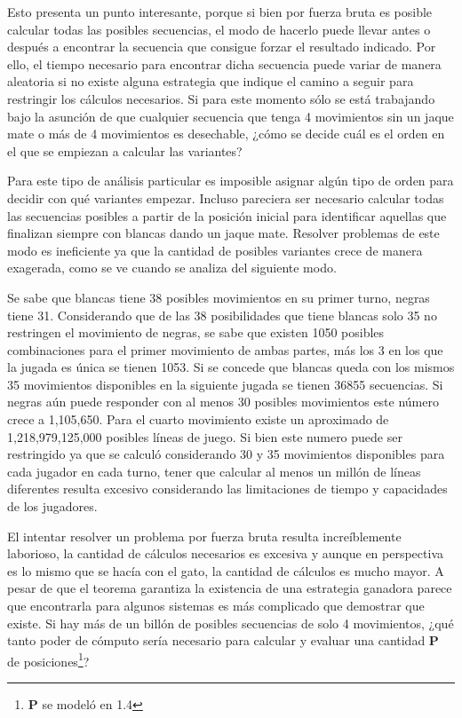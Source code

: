\documentclass[twoside,openright,12pt,a4paper,spanish]{book}
\begin{document}
Esto presenta un punto interesante, porque si bien por fuerza bruta es posible calcular todas las posibles secuencias, el modo de hacerlo puede llevar antes o después a encontrar la secuencia que consigue forzar el resultado indicado. Por ello, el tiempo necesario para encontrar dicha secuencia puede variar de manera aleatoria si no existe alguna estrategia que indique el camino a seguir para restringir los cálculos necesarios. Si para este momento sólo se está trabajando bajo la asunción de que cualquier secuencia que tenga 4 movimientos sin un jaque mate o más de 4 movimientos es desechable, ¿cómo se decide cuál es el orden en el que se empiezan a calcular las variantes?

Para este tipo de análisis particular es imposible asignar algún tipo de orden para decidir con qué variantes empezar. Incluso pareciera ser necesario calcular todas las secuencias posibles a partir de la posición inicial para identificar aquellas que finalizan siempre con blancas dando un jaque mate. Resolver problemas de este modo es ineficiente ya que la cantidad de posibles variantes crece de manera exagerada, como se ve cuando se analiza del siguiente modo.

Se sabe que blancas tiene 38 posibles movimientos en su primer turno, negras tiene 31. Considerando que de las 38 posibilidades que tiene blancas solo 35 no restringen el movimiento de negras, se sabe que existen 1050 posibles combinaciones para el primer movimiento de ambas partes, más los 3 en los que la jugada es única se tienen 1053. Si se concede que blancas queda con los mismos 35 movimientos disponibles en la siguiente jugada se tienen 36855 secuencias. Si negras aún puede responder con al menos 30 posibles movimientos este número crece a 1,105,650. Para el cuarto movimiento existe un aproximado de 1,218,979,125,000 posibles líneas de juego. Si bien este numero puede ser restringido ya que se calculó considerando 30 y 35 movimientos disponibles para cada jugador en cada turno, tener que calcular al menos un millón de líneas diferentes resulta excesivo considerando las limitaciones de tiempo y capacidades de los jugadores.

El intentar resolver un problema por fuerza bruta resulta increíblemente laborioso, la cantidad de cálculos necesarios es excesiva y aunque en perspectiva es lo mismo que se hacía con el gato, la cantidad de cálculos es mucho mayor. A pesar de que el teorema garantiza la existencia de una estrategia ganadora parece que encontrarla para algunos sistemas es más complicado que demostrar que existe. Si hay más de un billón de posibles secuencias de solo 4 movimientos, ¿qué tanto poder de cómputo sería necesario para calcular y evaluar una cantidad \textbf{P} de posiciones\footnote{\textbf{P} se modeló en 1.4}?
\end{document}
